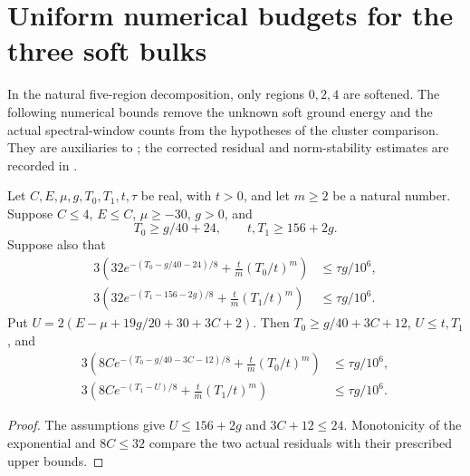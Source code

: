 \section{Uniform numerical budgets for the three soft bulks}

In the natural five-region decomposition, only regions $0,2,4$ are
softened. The following numerical bounds remove the unknown soft ground
energy and the actual spectral-window counts from the hypotheses of the
cluster comparison. They are auxiliaries to
\cite[lines 1373--1420]{Arad2016RigorousRG}; the corrected residual and
norm-stability estimates are recorded in
\cite{gap:alvv16_soft_regional_residuals,gap:alvv16_cluster_approximation}.

\begin{lemma}
    \label{lem:alvv_soft_scalar_residual_budgets}
    \leanok
    Let $C,E,\mu,g,T_0,T_1,t,\tau$ be real, with $t>0$, and let $m\ge2$ be a natural number.
    Suppose $C\le4$, $E\le C$, $\mu\ge-30$, $g>0$, and
    \[
        T_0\ge g/40+24,\qquad t,T_1\ge156+2g.
    \]
    Suppose also that
    \begin{align}
        3\left(32e^{-(T_0-g/40-24)/8}
        +\frac{t}{m}(T_0/t)^m\right) & \le\tau g/10^6, \\
        3\left(32e^{-(T_1-156-2g)/8}
        +\frac{t}{m}(T_1/t)^m\right) & \le\tau g/10^6.
    \end{align}
    Put $U=2(E-\mu+19g/20+30+3C+2)$. Then
    $T_0\ge g/40+3C+12$, $U\le t,T_1$, and
    \begin{align}
        3\left(8Ce^{-(T_0-g/40-3C-12)/8}
        +\frac{t}{m}(T_0/t)^m\right) & \le\tau g/10^6, \\
        3\left(8Ce^{-(T_1-U)/8}
        +\frac{t}{m}(T_1/t)^m\right) & \le\tau g/10^6.
    \end{align}
\end{lemma}
\begin{proof}\leanok
    The assumptions give $U\le156+2g$ and $3C+12\le24$.
    Monotonicity of the exponential and $8C\le32$ compare the two
    actual residuals with their prescribed upper bounds.
\end{proof}

